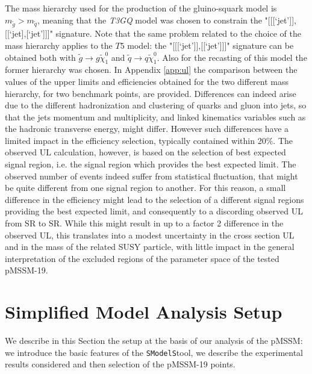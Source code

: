 \documentclass[preprint,number,sort&compress,twocolumn,3p]{elsstyarticle}
\newcommand{\SMO}{\texttt{SModelS\xspace}}
\begin{document}
The mass hierarchy used for the production of the gluino-squark model is $m_{\tilde g} > m_{\tilde q}$, meaning that the \textit{T3GQ} model was chosen to constrain the "[[[`jet']],[[`jet],[`jet']]]" signature. Note that the same problem related to the choice of the mass hierarchy applies to the $T5$ model: the "[[[`jet']],[[`jet']]]" signature can be obtained both with $\tilde g \rightarrow g \tilde \chi _1 ^0$ and $\tilde q \rightarrow q \tilde \chi _1 ^0$. Also for the recasting of this model the former hierarchy was chosen. In Appendix \ref{app:ul} the comparison between the values of the upper limits and efficiencies obtained for the two different mass hierarchy, for two benchmark points, are provided. Differences can indeed arise due to the different hadronization and clustering of quarks and gluon into jets, so that the jets momentum and multiplicity, and linked kinematics variables such as the hadronic transverse energy, might differ. However such differences have a limited impact in the efficiency selection, typically contained within 20$\%$. The observed UL calculation, however, is based on the selection of best expected signal region, i.e. the signal region which provides the best expected limit. The observed number of events indeed suffer from statistical fluctuation, that might be quite different from one signal region to another. For this reason, a small difference in the efficiency might lead to the selection of a different signal regions providing the best expected limit, and consequently to a discording observed UL from SR to SR. While this might result in up to a factor 2 difference in the observed UL, this translates into a modest uncertainty in the cross section UL and in the mass of the related SUSY particle, with little impact in the general interpretation of the excluded regions of the parameter space of the tested pMSSM-19. 
%
\section{Simplified Model Analysis Setup}\label{sec::setup}
We describe in this Section the setup at the basis of our analysis of the pMSSM: we introduce the basic features of the \SMO tool, we describe the experimental results considered and then selection of the pMSSM-19 points. 
\end{document}
